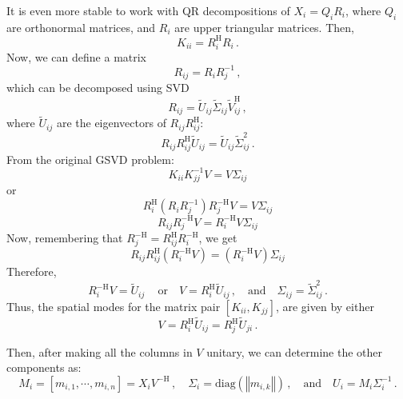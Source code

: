 \documentclass[10pt]{article}
\newcommand{\norm}[1]{\left\Vert#1\right\Vert}
\begin{document}
It is even more stable to work with QR decompositions of $X_i=Q_iR_i$, where $Q_i$ are orthonormal matrices, and $R_i$ are upper triangular matrices.
Then,
\begin{equation}
    K_{ii} = R_i^\mathrm{H}R_i\,.
\end{equation}
Now, we can define a matrix
\begin{equation}
    R_{ij} = R_iR_j^{-1}\,,
\end{equation}
which can be decomposed using SVD
\begin{equation}
    R_{ij} = \tilde U_{ij} \tilde \Sigma_{ij} \tilde V_{ij}^\mathrm{H}\,,
\end{equation}
where $\tilde U_{ij}$ are the eigenvectors of $R_{ij}R_{ij}^\mathrm{H}$:
\begin{equation}
     R_{ij} R_{ij}^\mathrm{H} \tilde U_{ij} = \tilde U_{ij} \tilde \Sigma^2_{ij} \,.
\end{equation}
From the original GSVD problem:
\begin{equation}
    K_{ii}K_{jj}^{-1} V = V \Sigma_{ij}
\end{equation}
or 
\begin{equation}
    R_i^\mathrm{H}\left(R_iR_j^{-1}\right)R_j^\mathrm{-H} V = V \Sigma_{ij}
\end{equation}
\begin{equation}
    R_{ij} R_j^\mathrm{-H} V = R_i^\mathrm{-H} V \Sigma_{ij}
\end{equation}
Now, remembering that $R_j^\mathrm{-H} = R_{ij}^\mathrm{H} R_i^\mathrm{-H}$, we get
\begin{equation}
    R_{ij} R_{ij}^\mathrm{H} \left(R_i^\mathrm{-H} V\right) = \left(R_i^\mathrm{-H} V\right) \Sigma    _{ij}
\end{equation}
Therefore,
\begin{equation}
    R_i^\mathrm{-H}V = \tilde U_{ij}\,\quad\mathrm{or}\quad V = R_i^\mathrm{H} \tilde U_{ij}\,, \quad \mathrm{and} \quad \Sigma_{ij} = \tilde \Sigma_{ij}^2\,.
\end{equation}
Thus, the spatial modes for the matrix pair $[K_{ii},K_{jj}]$, are given by either
\begin{equation}
    V = R_i^\mathrm{H} \tilde U_{ij} = R_j^\mathrm{H} \tilde U_{ji}\,.
\end{equation}

Then, after making all the columns in $V$ unitary, we can determine the other components as:
\begin{equation}
    M_i=\left[m_{i,1}, \cdots, m_{i,n} \right] = X_i V^\mathrm{-H}\,, \quad \Sigma_{i} = \mathrm{diag} \left(\norm{m_{i,k}}\right)\,, \quad \mathrm{and} \quad U_i = M_i \Sigma_{i}^{-1}\,.
\end{equation}
\end{document}
